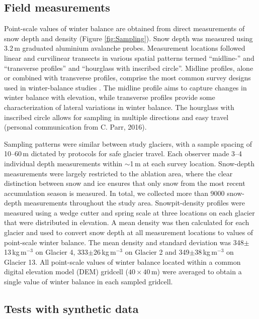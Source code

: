 \documentclass{article}
\begin{document}
\subsection{Field measurements}

Point-scale values of winter balance are obtained from direct measurements of snow depth and density (Figure \ref{fig:Sampling}). Snow depth was measured using  3.2\,m graduated aluminium avalanche probes. 
Measurement locations followed linear and curvilinear transects in various spatial patterns termed ``midline-'' and ``transverse profiles'' and ``hourglass with inscribed circle''. 
Midline profiles, alone or combined with transverse profiles, comprise the most common survey designs used in winter-balance studies \citep[e.g.][]{Kaser2002, Machguth2006}. The midline profile aims to capture changes in winter balance with elevation, while transverse profiles provide some characterization of lateral variations in winter balance. The hourglass with inscribed circle allows for sampling in multiple directions and easy travel (personal communication from C. Parr, 2016). 

Sampling patterns were similar between study glaciers, with a sample spacing of 10--60\,m dictated by protocols for safe glacier travel. Each observer made 3--4 individual depth measurements within $\sim$1\,m at each survey location. Snow-depth measurements were largely restricted to the ablation area, where the clear distinction between snow and ice ensures that only snow from the most recent accumulation season is measured. In total, we collected more than 9000 snow-depth measurements throughout the study area. Snowpit-density profiles were measured using a wedge cutter and spring scale at three locations on each glacier that were distributed in elevation. A mean density was then calculated for each glacier and used to convert snow depth at all measurement locations to values of point-scale winter balance. The mean density and standard deviation was 348$\pm$13\,kg\,m$^{-3}$ on Glacier 4, 333$\pm$26\,kg\,m$^{-3}$ on Glacier 2 and 349$\pm$38\,kg\,m$^{-3}$ on Glacier 13. All point-scale values of winter balance located within a common digital elevation model (DEM) gridcell ($40\times40$\,m) were averaged to obtain a single value of winter balance in each sampled gridcell. 

\subsection{Tests with synthetic data}
\end{document}
